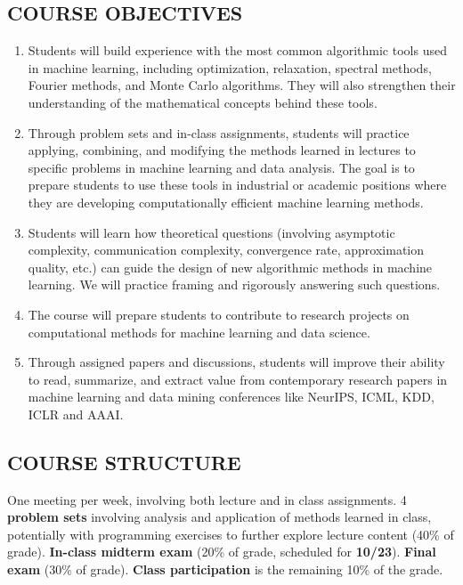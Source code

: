 \documentclass[10pt]{article}
\begin{document}
\subsection{COURSE OBJECTIVES}
\begin{enumerate}
\item Students will build experience with the most common algorithmic tools used in machine learning, including optimization, relaxation, spectral methods, Fourier methods, and Monte Carlo algorithms. They will also strengthen their understanding of the mathematical concepts behind these tools.

\item Through problem sets and in-class assignments, students will practice applying, combining, and modifying the methods learned in lectures to specific problems in machine learning and data analysis. The goal is to prepare students to use these tools in industrial or academic positions where they are developing computationally efficient machine learning methods.

\item Students will learn how theoretical questions (involving asymptotic complexity, communication complexity, convergence rate, approximation quality, etc.) can guide the design of new algorithmic methods in machine learning. We will practice framing and rigorously answering such questions.

\item The course will prepare students to contribute to research projects on computational methods for machine learning and data science.

\item Through assigned papers and discussions, students will improve their ability to read, summarize, and extract value from contemporary research papers in machine learning and data mining conferences like NeurIPS, ICML, KDD, ICLR and AAAI.
\end{enumerate}

\subsection{COURSE STRUCTURE}

One meeting per week, involving both lecture and in class assignments. 4 \textbf{problem sets} involving analysis and application of methods learned in class, potentially with programming exercises to further explore lecture content (40\% of grade). \textbf{In-class midterm exam} (20\% of grade, scheduled for \textbf{10/23}). \textbf{Final exam} (30\% of grade). \textbf{Class participation} is the remaining 10\% of the grade. 
\end{document}
